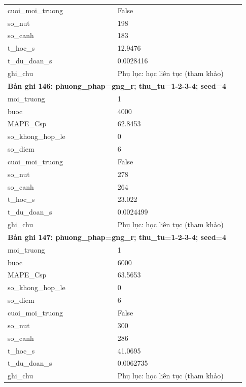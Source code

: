 \begin{longtable}{p{0.43\linewidth}p{0.50\linewidth}}
cuoi\_\allowbreak moi\_\allowbreak truong & False \\
so\_\allowbreak nut & 198 \\
so\_\allowbreak canh & 183 \\
t\_\allowbreak hoc\_\allowbreak s & 12.9476 \\
t\_\allowbreak du\_\allowbreak doan\_\allowbreak s & 0.0028416 \\
ghi\_\allowbreak chu & Phụ lục: học liên tục (tham khảo) \\
\midrule
\multicolumn{2}{p{0.95\linewidth}}{\textbf{Bản ghi 146: phuong\_phap=gng\_r; thu\_tu=1-2-3-4; seed=4}} \\
moi\_\allowbreak truong & 1 \\
buoc & 4000 \\
MAPE\_\allowbreak Csp & 62.8453 \\
so\_\allowbreak khong\_\allowbreak hop\_\allowbreak le & 0 \\
so\_\allowbreak diem & 6 \\
cuoi\_\allowbreak moi\_\allowbreak truong & False \\
so\_\allowbreak nut & 278 \\
so\_\allowbreak canh & 264 \\
t\_\allowbreak hoc\_\allowbreak s & 23.022 \\
t\_\allowbreak du\_\allowbreak doan\_\allowbreak s & 0.0024499 \\
ghi\_\allowbreak chu & Phụ lục: học liên tục (tham khảo) \\
\midrule
\multicolumn{2}{p{0.95\linewidth}}{\textbf{Bản ghi 147: phuong\_phap=gng\_r; thu\_tu=1-2-3-4; seed=4}} \\
moi\_\allowbreak truong & 1 \\
buoc & 6000 \\
MAPE\_\allowbreak Csp & 63.5653 \\
so\_\allowbreak khong\_\allowbreak hop\_\allowbreak le & 0 \\
so\_\allowbreak diem & 6 \\
cuoi\_\allowbreak moi\_\allowbreak truong & False \\
so\_\allowbreak nut & 300 \\
so\_\allowbreak canh & 286 \\
t\_\allowbreak hoc\_\allowbreak s & 41.0695 \\
t\_\allowbreak du\_\allowbreak doan\_\allowbreak s & 0.0062735 \\
ghi\_\allowbreak chu & Phụ lục: học liên tục (tham khảo) \\

\end{longtable}
